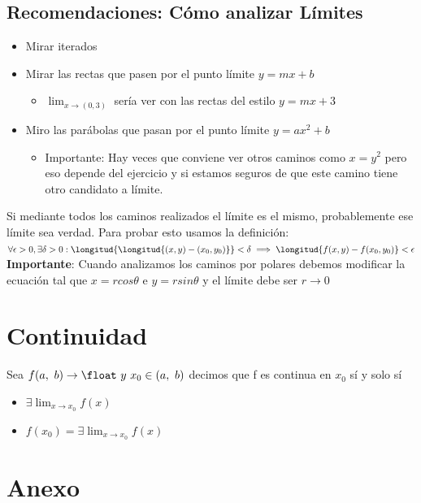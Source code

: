 \documentclass[10pt,a4paper]{article}
\begin{document}
\subsection*{Recomendaciones: Cómo analizar Límites}
\begin{itemize}
    \item Mirar iterados
    \item Mirar las rectas que pasen por el punto límite $y = mx + b$
    \begin{itemize}
        \item $\lim_{x \to (0, 3)}$ sería ver con las rectas del estilo $y=mx+3$
    \end{itemize}
    \item Miro las parábolas que pasan por el punto límite $y=ax^{2} + b$
    \begin{itemize}
        \item Importante: Hay veces que conviene ver otros caminos como $x=y^{2}$ pero eso depende del ejercicio y si estamos seguros de que este camino tiene otro candidato a límite. 
    \end{itemize}
\end{itemize}
Si mediante todos los caminos realizados el límite es el mismo, probablemente ese límite sea verdad. Para probar esto usamos la definición: $\forall \epsilon > 0, \exists \delta > 0 : \longitud{\longitud{(x,y) - (x_{0}, y_{0})}} < \delta \implies \longitud{f(x, y) - f(x_{0}, y_{0})} < \epsilon $ \\
\textbf{Importante}: Cuando analizamos los caminos por polares debemos modificar la ecuación tal que $x = r cos \theta$ e $ y = r sin \theta$ y el límite debe ser $r \rightarrow 0$
\section*{Continuidad}
Sea $f(a, \ b) \rightarrow \float \ y \ x_{0} \in (a, \ b)$ decimos que f es continua en $x_{0}$ sí y solo sí 
\begin{itemize}
    \item $\exists \lim_{x\to x_{0}} f(x) $
    \item $f(x_{0}) = \exists \lim_{x\to x_{0}} f(x) $
\end{itemize}
\section*{Anexo}
\end{document}
